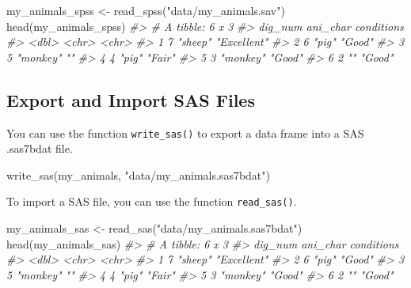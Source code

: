 \documentclass[
]{book}
\newenvironment{Shaded}{\begin{snugshade}}{\end{snugshade}}
\newcommand{\CommentTok}[1]{\textcolor[rgb]{0.56,0.35,0.01}{\textit{#1}}}
\newcommand{\FunctionTok}[1]{\textcolor[rgb]{0.00,0.00,0.00}{#1}}
\newcommand{\NormalTok}[1]{#1}
\newcommand{\OtherTok}[1]{\textcolor[rgb]{0.56,0.35,0.01}{#1}}
\newcommand{\StringTok}[1]{\textcolor[rgb]{0.31,0.60,0.02}{#1}}
\begin{document}
\begin{Shaded}
\begin{Highlighting}[]
\NormalTok{my\_animals\_spss }\OtherTok{\textless{}{-}} \FunctionTok{read\_spss}\NormalTok{(}\StringTok{"data/my\_animals.sav"}\NormalTok{)}
\FunctionTok{head}\NormalTok{(my\_animals\_spss)}
\CommentTok{\#\textgreater{} \# A tibble: 6 x 3}
\CommentTok{\#\textgreater{}   dig\_num ani\_char conditions }
\CommentTok{\#\textgreater{}     \textless{}dbl\textgreater{} \textless{}chr\textgreater{}    \textless{}chr\textgreater{}      }
\CommentTok{\#\textgreater{} 1       7 "sheep"  "Excellent"}
\CommentTok{\#\textgreater{} 2       6 "pig"    "Good"     }
\CommentTok{\#\textgreater{} 3       5 "monkey" ""         }
\CommentTok{\#\textgreater{} 4       4 "pig"    "Fair"     }
\CommentTok{\#\textgreater{} 5       3 "monkey" "Good"     }
\CommentTok{\#\textgreater{} 6       2 ""       "Good"}
\end{Highlighting}
\end{Shaded}

\hypertarget{export-and-import-sas-files}{%
\subsection{Export and Import SAS Files}\label{export-and-import-sas-files}}

You can use the function \texttt{write\_sas()} to export a data frame into a SAS .sas7bdat file.

\begin{Shaded}
\begin{Highlighting}[]
\FunctionTok{write\_sas}\NormalTok{(my\_animals, }\StringTok{"data/my\_animals.sas7bdat"}\NormalTok{)}
\end{Highlighting}
\end{Shaded}

To import a SAS file, you can use the function \texttt{read\_sas()}.

\begin{Shaded}
\begin{Highlighting}[]
\NormalTok{my\_animals\_sas }\OtherTok{\textless{}{-}} \FunctionTok{read\_sas}\NormalTok{(}\StringTok{"data/my\_animals.sas7bdat"}\NormalTok{)}
\FunctionTok{head}\NormalTok{(my\_animals\_sas)}
\CommentTok{\#\textgreater{} \# A tibble: 6 x 3}
\CommentTok{\#\textgreater{}   dig\_num ani\_char conditions }
\CommentTok{\#\textgreater{}     \textless{}dbl\textgreater{} \textless{}chr\textgreater{}    \textless{}chr\textgreater{}      }
\CommentTok{\#\textgreater{} 1       7 "sheep"  "Excellent"}
\CommentTok{\#\textgreater{} 2       6 "pig"    "Good"     }
\CommentTok{\#\textgreater{} 3       5 "monkey" ""         }
\CommentTok{\#\textgreater{} 4       4 "pig"    "Fair"     }
\CommentTok{\#\textgreater{} 5       3 "monkey" "Good"     }
\CommentTok{\#\textgreater{} 6       2 ""       "Good"}
\end{Highlighting}
\end{Shaded}
\end{document}
